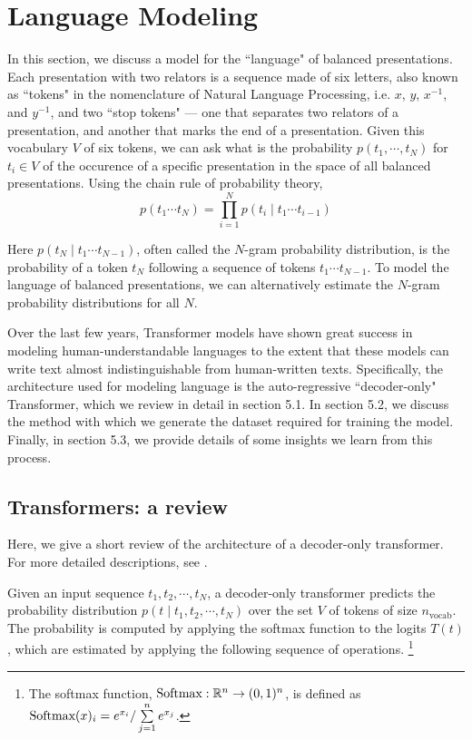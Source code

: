 
\section{Language Modeling}

In this section, we discuss a model for the ``language" of balanced presentations. Each presentation with two relators is a sequence made of six letters, also known as ``tokens" in the nomenclature of Natural Language Processing, i.e. $x$, $y$, $x^{-1}$, and $y^{-1}$, and two ``stop tokens" --- one that separates two relators of a presentation, and another that marks the end of a presentation. Given this vocabulary $V$ of six tokens, we can ask what is the probability $p(t_1, \cdots, t_N)$ for $t_i \in V$ of the occurence of a specific presentation in the space of all balanced presentations. Using the chain rule of probability theory, 
\[
p(t_1 \cdots t_{N}) = \prod\limits_{i=1}^{N} p (t_{i} \mid t_{1} \cdots t_{i-1}) 
\]

Here $p (t_{N} \mid t_{1} \cdots t_{N-1})$, often called the $N$-gram probability distribution, is the probability of a token $t_N$ following a sequence of tokens $t_{1} \cdots t_{N-1}$. To model the language of balanced presentations, we can alternatively estimate the $N$-gram probability distributions for all $N$. 

Over the last few years, Transformer models have shown great success in modeling human-understandable languages to the extent that these models can write text almost indistinguishable from human-written texts. Specifically, the architecture used for modeling language is the auto-regressive ``decoder-only" Transformer, which we review in detail in section 5.1. In section 5.2, we discuss the method with which we generate the dataset required for training the model. Finally, in section 5.3, we provide details of some insights we learn from this process. 

\subsection{Transformers: a review}

Here, we give a short review of the architecture of a decoder-only transformer. For more detailed descriptions, see \cite{vaswani2023attention, elhage2021mathematical, douglas2023large}. 

Given an input sequence $t_1, t_2, \cdots, t_{N}$, a decoder-only transformer predicts the probability distribution $p(t \mid t_1, t_2, \cdots, t_{N})$ over the set $V$ of tokens of size $n_{\text{vocab}}$. The probability is computed by applying the softmax function to the logits $T(t)$, which are estimated by applying the following sequence of operations.
\footnote{The softmax function, $\text{Softmax}: \mathbb{R}^n \to (0, 1)^{n}$, is defined as $\text{Softmax}(x)_i = e^{x_i} / \sum\limits_{j=1}^n e^{x_j}$.}

